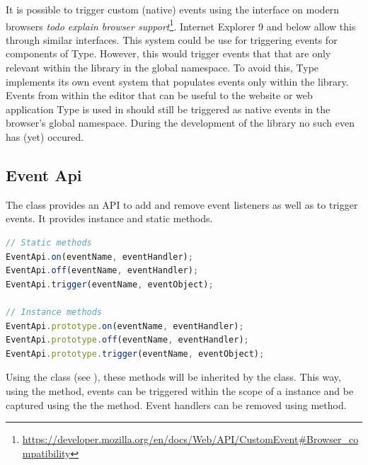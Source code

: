 It is possible to trigger custom (native) events using the  interface on modern browsers \textit{todo explain browser support}\footnote{\url{https://developer.mozilla.org/en/docs/Web/API/CustomEvent\#Browser_compatibility}}. Internet Explorer 9 and below allow this through similar interfaces. This system could be use for triggering events for components of Type. However, this would trigger events that that are only relevant within the library in the global namespace. To avoid this, Type implements its own event system that populates events only within the library. Events from within the editor that can be useful to the website or web application Type is used in should still be triggered as native events in the browser's global namespace. During the development of the library no such even has (yet) occured.


\subsection{Event Api}

The  class provides an API to add and remove event listeners as well as to trigger events. It provides instance and static methods.

\begin{lstlisting}[language=JavaScript, caption={EventApi methods}, label=lst:eventapi_methods]
// Static methods
EventApi.on(eventName, eventHandler);
EventApi.off(eventName, eventHandler);
EventApi.trigger(eventName, eventObject);

// Instance methods
EventApi.prototype.on(eventName, eventHandler);
EventApi.prototype.off(eventName, eventHandler);
EventApi.prototype.trigger(eventName, eventObject);
\end{lstlisting}


Using the  class (see ), these methods will be inherited by the  class. This way, using the  method, events can be triggered within the scope of a  instance and be captured using the  the  method. Event handlers can be removed using  method.

